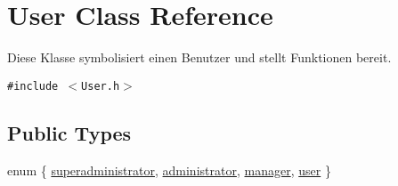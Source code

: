 \hypertarget{class_user}{
\section{User Class Reference}
\label{class_user}
}
Diese Klasse symbolisiert einen Benutzer und stellt Funktionen bereit.  


{\tt \#include $<$User.h$>$}

\subsection*{Public Types}
\begin{CompactItemize}
\item 
enum \{ \hyperlink{class_user_6f9db9ebdd86f9c93deff41f7b9193f11bc1a99427bacb8101d7b99796ce2148}{superadministrator}, 
\hyperlink{class_user_6f9db9ebdd86f9c93deff41f7b9193f155b52804af3433a9d28257d0a0a54eb3}{administrator}, 
\hyperlink{class_user_6f9db9ebdd86f9c93deff41f7b9193f11813ae9ec397f1858dda882399516656}{manager}, 
\hyperlink{class_user_6f9db9ebdd86f9c93deff41f7b9193f1d7f13ff6c9b4738cc12563330ef164e9}{user}
 \}
\end{CompactItemize}
